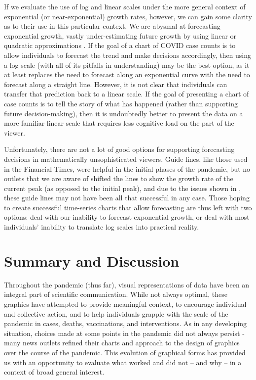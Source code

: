 \documentclass[article]{jdssv}\usepackage[]{graphicx}\usepackage[]{xcolor}
\begin{document}
If we evaluate the use of log and linear scales under the more general context of exponential (or near-exponential) growth rates, however, we can gain some clarity as to their use in this particular context. We are abysmal at forecasting exponential growth, vastly under-estimating future growth by using linear or quadratic approximations \citep{wagenaarExtrapolationExponentialTime1978a,lawrenceExploringJudgementalForecasting1992,timmersInverseStatisticsMisperception1977a}. If the goal of a chart of COVID case counts is to allow individuals to forecast the trend and make decisions accordingly, then using a log scale (with all of its pitfalls in understanding) may be the best option, as it at least replaces the need to forecast along an exponential curve with the need to forecast along a straight line. However, it is not clear that individuals can transfer that prediction back to a linear scale. If the goal of presenting a chart of case counts is to tell the story of what has happened (rather than supporting future decision-making), then it is undoubtedly better to present the data on a more familiar linear scale that requires less cognitive load on the part of the viewer. 

Unfortunately, there are not a lot of good options for supporting forecasting decisions in mathematically unsophisticated viewers. Guide lines, like those used in the Financial Times, were helpful in the initial phases of the pandemic, but no outlets that we are aware of shifted the lines to show the growth rate of the current peak (as opposed to the initial peak), and due to the issues shown in , these guide lines may not have been all that successful in any case. Those hoping to create successful time-series charts that allow forecasting are thus left with two options: deal with our inability to forecast exponential growth, or deal with most individuals' inability to translate log scales into practical reality. 


\section{Summary and Discussion} \label{sec:summary}
Throughout the pandemic (thus far), visual representations of data have been an integral part of scientific communication. While not always optimal, these graphics have attempted to provide meaningful context, to encourage individual and collective action, and to help individuals grapple with the scale of the pandemic in cases, deaths, vaccinations, and interventions. As in any developing situation, choices made at some points in the pandemic did not always persist - many news outlets refined their charts and approach to the design of graphics over the course of the pandemic. This evolution of graphical forms has provided us with an opportunity to evaluate what worked and did not -- and why -- in a context of broad general interest. 
\end{document}

